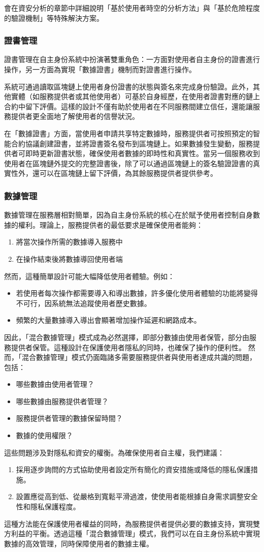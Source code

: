 會在資安分析的章節中詳細說明「基於使用者時空的分析方法」與「基於危險程度的驗證機制」等特殊解決方案。
\subsubsection{證書管理}
證書管理在自主身份系統中扮演著雙重角色：一方面對使用者自主身份的證書進行操作，另一方面為實現「數據證書」機制而對證書進行操作。

系統可通過讀取區塊鏈上使用者身份證書的狀態與簽名來完成身份驗證。此外，其他實體（如服務提供者或其他使用者）可基於自身經歷，在使用者證書對應的鏈上合約中留下評價。這樣的設計不僅有助於使用者在不同服務間建立信任，還能讓服務提供者更全面地了解使用者的信譽狀況。

在「數據證書」方面，當使用者申請共享特定數據時，服務提供者可按照預定的智能合約協議創建證書，並將證書簽名發布到區塊鏈上。如果數據發生變動，服務提供者可即時更新證書狀態，確保使用者數據的即時性和真實性。當另一個服務收到使用者在區塊鏈外提交的完整證書後，除了可以通過區塊鏈上的簽名驗證證書的真實性外，還可以在區塊鏈上留下評價，為其餘服務提供者提供參考。
\subsubsection{數據管理}
數據管理在服務層相對簡單，因為自主身份系統的核心在於賦予使用者控制自身數據的權利。理論上，服務提供者的最低要求是確保使用者能夠：
\begin{enumerate}
  \item 將當次操作所需的數據導入服務中
  \item 在操作結束後將數據導回使用者端
\end{enumerate}
然而，這種簡單設計可能大幅降低使用者體驗。例如：
\begin{itemize}
  \item 若使用者每次操作都需要導入和導出數據，許多優化使用者體驗的功能將變得不可行，因系統無法追蹤使用者歷史數據。
  \item 頻繁的大量數據導入導出會顯著增加操作延遲和網路成本。
\end{itemize}
因此，「混合數據管理」模式成為必然選擇，即部分數據由使用者保管，部分由服務提供者保管。這種設計在保護使用者隱私的同時，也確保了操作的便利性。
然而，「混合數據管理」模式仍面臨諸多需要服務提供者與使用者達成共識的問題，包括：
\begin{itemize}
  \item 哪些數據由使用者管理？
  \item 哪些數據由服務提供者管理？
  \item 服務提供者管理的數據保留時間？
  \item 數據的使用權限？
\end{itemize}
這些問題涉及對隱私和資安的權衡。為確保使用者自主權，我們建議：
\begin{enumerate}
  \item 採用逐步詢問的方式協助使用者設定所有簡化的資安措施或降低的隱私保護措施。
  \item 設置應從高到低、從嚴格到寬鬆平滑過渡，使使用者能根據自身需求調整安全性和隱私保護程度。
\end{enumerate}
這種方法能在保護使用者權益的同時，為服務提供者提供必要的數據支持，實現雙方利益的平衡。透過這種「混合數據管理」模式，我們可以在自主身份系統中實現數據的高效管理，同時保障使用者的數據主權。
